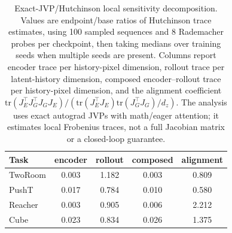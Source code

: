 \begin{table}[H]
\centering
\caption{Exact-JVP/Hutchinson local sensitivity decomposition. Values are endpoint/base ratios of Hutchinson trace estimates, using 100 sampled sequences and 8 Rademacher probes per checkpoint, then taking medians over training seeds when multiple seeds are present. Columns report encoder trace per history-pixel dimension, rollout trace per latent-history dimension, composed encoder--rollout trace per history-pixel dimension, and the alignment coefficient $\mathrm{tr}(J_E^\top J_G^\top J_G J_E)/(\mathrm{tr}(J_E^\top J_E)\mathrm{tr}(J_G^\top J_G)/d_z)$. The analysis uses exact autograd JVPs with math/eager attention; it estimates local Frobenius traces, not a full Jacobian matrix or a closed-loop guarantee.}
\label{tab:jvp-hutchinson-sensitivity-audit}
\small
\setlength{\tabcolsep}{3.5pt}
\begin{tabular}{lcccc}
\toprule
Task & encoder & rollout & composed & alignment \\
\midrule
TwoRoom & 0.003 & 1.182 & 0.003 & 0.809 \\
PushT & 0.017 & 0.784 & 0.010 & 0.580 \\
Reacher & 0.003 & 0.905 & 0.006 & 2.212 \\
Cube & 0.023 & 0.834 & 0.026 & 1.375 \\
\bottomrule
\end{tabular}
\end{table}
